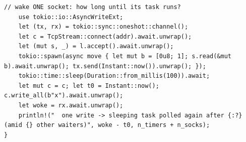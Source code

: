 \begin{lstlisting}[caption={Idle cost and wake-up latency with 100,000 timers and 9,000 sockets.}, label=lst:wakers-A.4]
    // wake ONE socket: how long until its task runs?
    use tokio::io::AsyncWriteExt;
    let (tx, rx) = tokio::sync::oneshot::channel();
    let c = TcpStream::connect(addr).await.unwrap();
    let (mut s, _) = l.accept().await.unwrap();
    tokio::spawn(async move { let mut b = [0u8; 1]; s.read(&mut b).await.unwrap(); tx.send(Instant::now()).unwrap(); });
    tokio::time::sleep(Duration::from_millis(100)).await;
    let mut c = c; let t0 = Instant::now(); c.write_all(b"x").await.unwrap();
    let woke = rx.await.unwrap();
    println!("  one write -> sleeping task polled again after {:?} (amid {} other waiters)", woke - t0, n_timers + n_socks);
}
\end{lstlisting}
